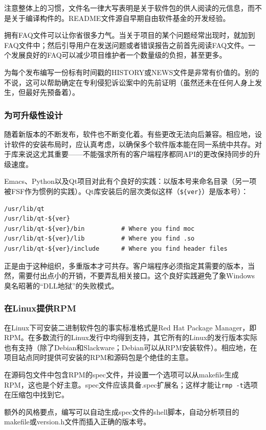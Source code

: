 \documentclass[12pt,oneside]{book}
\begin{document}
注意整体上的习惯，文件名一律大写表明是关于软件包的供人阅读的元信息，而不是关于编译构件的。README文件源自早期自由软件基金的开发经验。

拥有FAQ文件可以让你省很多力气。当关于项目的某个问题经常出现时，就加到FAQ文件中；然后引导用户在发送问题或者错误报告之前首先阅读FAQ文件。一个发展良好的FAQ可以减少项目维护者一个数量级的负担，甚至更多。

为每个发布编写一份标有时间戳的HISTORY或NEWS文件是非常有价值的。别的不说，这可以帮助确定在专利侵犯诉讼案中的先前证明（虽然还未在任何人身上发生，但最好先预备着）。

\subsubsection{为可升级性设计}
随着新版本的不断发布，软件也不断变化着。有些更改无法向后兼容。相应地，设计软件的安装布局时，应认真考虑，以确保多个软件版本能在同一系统中共存。对于库来说这尤其重要——不能强求所有的客户端程序都同API的更改保持同步的升级速度。

Emacs、Python以及Qt项目对此有个良好的实践：以版本号来命名目录（另一项被FSF作为惯例的实践）。Qt库安装后的层次类似这样（\verb+${ver}+）是版本号）：
\begin{Verbatim}
/usr/lib/qt
/usr/lib/qt-${ver}
/usr/lib/qt-${ver}/bin          # Where you find moc
/usr/lib/qt-${ver}/lib          # Where you find .so
/usr/lib/qt-${ver}/include      # Where you find header files
\end{Verbatim}

正是由于这种组织，多重版本才可共存。客户端程序必须指定其需要的版本，当然，需要付出点小的开销，不要弄乱相关接口。这个良好实践避免了象Windows臭名昭著的“DLL地狱”的失败模式。


\subsubsection{在Linux提供RPM}
在Linux下可安装二进制软件包的事实标准格式是Red Hat Package Manager，即RPM。在多数流行的Linux发行中均得到支持，其它所有的Linux的发行版本实际也有支持（除了Debian和Slackware；Debian可以从RPM安装软件）。相应地，在项目站点同时提供可安装的RPM和源码包是个绝佳的主意。

在源码包文件中包含RPM的spec文件，并设置一个选项可以从makefile生成RPM，这也是个好主意。spec文件应该具备.spec扩展名；这样才能让\verb+rmp -t+选项在压缩包中找到它。

额外的风格要点，编写可以自动生成spec文件的shell脚本，自动分析项目的makefile或version.h文件而插入正确的版本号。
\end{document}
